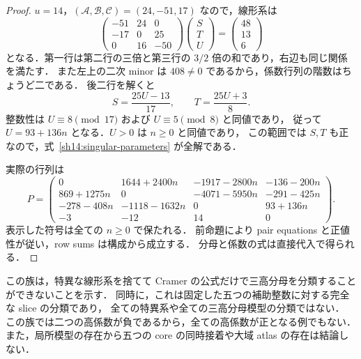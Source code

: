 \begin{proof}
$u=14$，$(\mathcal A,\mathcal B,\mathcal C)=(24,-51,17)$ なので，線形系は
\begin{equation}\label{sh14:rank-two-system}
 \begin{pmatrix}
 -51&24&0\\
 -17&0&25\\
 0&16&-50
 \end{pmatrix}
 \begin{pmatrix}S\\T\\U\end{pmatrix}
 =\begin{pmatrix}48\\13\\6\end{pmatrix}
\end{equation}
となる．第一行は第二行の三倍と第三行の $3/2$ 倍の和であり，右辺も同じ関係を満たす．
また左上の二次 minor は $408\ne0$ であるから，係数行列の階数はちょうど二である．
後二行を解くと
\[
 S=\frac{25U-13}{17},\qquad T=\frac{25U+3}{8}.
\]
整数性は $U\equiv8\pmod{17}$ および $U\equiv5\pmod8$ と同値であり，
従って $U=93+136n$ となる．$U>0$ は $n\geq0$ と同値であり，
この範囲では $S,T$ も正なので，式~\eqref{sh14:singular-parameters} が全解である．

実際の行列は
\[
 P=\begin{pmatrix}
 0&1644+2400n&-1917-2800n&-136-200n\\
 869+1275n&0&-4071-5950n&-291-425n\\
 -278-408n&-1118-1632n&0&93+136n\\
 -3&-12&14&0
 \end{pmatrix}.
\]
表示した符号は全ての $n\geq0$ で保たれる．
前命題により pair equations と正値性が従い，row sums は構成から成立する．
分母と係数の式は直接代入で得られる．
\end{proof}

この族は，特異な線形系を捨てて Cramer の公式だけで三高分母を分類することができないことを示す．
同時に，これは固定した五つの補助整数に対する完全な slice の分類であり，
全ての特異系や全ての三高分母模型の分類ではない．
この族では二つの高係数が負であるから，全ての高係数が正となる例でもない．
また，局所模型の存在から五つの core の同時接着や大域 atlas の存在は結論しない．
